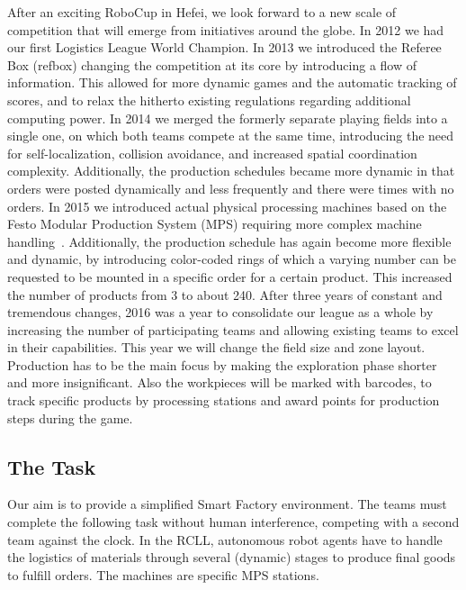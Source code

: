 \documentclass[12pt,twoside]{article}
\begin{document}
After an exciting RoboCup in Hefei, we look forward to a new scale of
competition that will emerge from initiatives around the globe. In
2012 we had our first Logistics League World Champion.  In 2013 we
introduced the Referee Box (refbox) changing the competition at its
core by introducing a flow of information. This allowed for more
dynamic games and the automatic tracking of scores, and to relax the
hitherto existing regulations regarding additional computing power. In
2014 we merged the formerly separate playing fields into a single one,
on which both teams compete at the same time, introducing the need for
self-localization, collision avoidance, and increased spatial
coordination complexity. Additionally, the production schedules became
more dynamic in that orders were posted dynamically and less
frequently and there were times with no orders. In 2015 we introduced
actual physical processing machines based on the Festo Modular
Production System (MPS) requiring more complex machine
handling~\cite{wdrl2013}. Additionally, the production schedule has
again become more flexible and dynamic, by introducing color-coded
rings of which a varying number can be requested to be mounted in a
specific order for a certain product. This increased the number of
products from 3 to about 240. After three years of constant and
tremendous changes, 2016 was a year to consolidate our league as a
whole by increasing the number of participating teams and allowing
existing teams to excel in their capabilities. This year we will change 
the field size and zone layout. Production has to be the main focus by
making the exploration phase shorter and more insignificant.
Also the workpieces will be marked with barcodes, to track specific
products by processing stations and award points for production 
steps during the game.

\subsection{The Task}
\label{sec:task}

Our aim is to provide a simplified Smart Factory environment. The
teams must complete the following task without human interference,
competing with a second team against the clock. In the RCLL,
autonomous robot agents have to handle the logistics of materials
through several (dynamic) stages to produce final goods to fulfill
orders. The machines are specific MPS stations.
\end{document}
